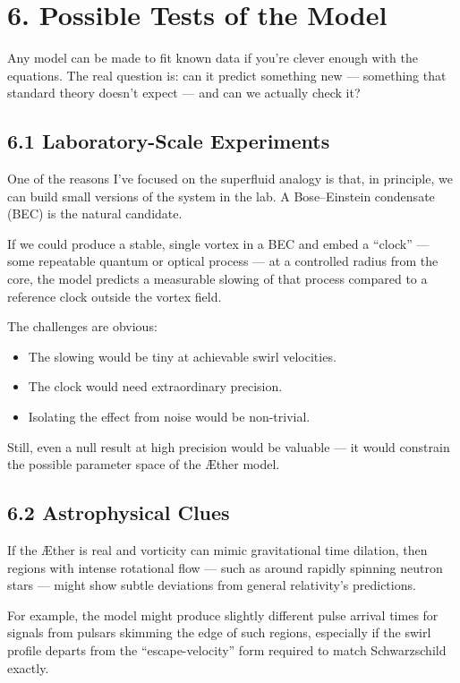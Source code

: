 \documentclass[11pt]{article}
\begin{document}
\section*{6. Possible Tests of the Model}

Any model can be made to fit known data if you’re clever enough with the equations. The real question is: can it predict something new — something that standard theory doesn’t expect — and can we actually check it?

\subsection*{6.1 Laboratory-Scale Experiments}

One of the reasons I’ve focused on the superfluid analogy is that, in principle, we can build small versions of the system in the lab. A Bose–Einstein condensate (BEC) is the natural candidate.

If we could produce a stable, single vortex in a BEC and embed a “clock” — some repeatable quantum or optical process — at a controlled radius from the core, the model predicts a measurable slowing of that process compared to a reference clock outside the vortex field.

The challenges are obvious:
\begin{itemize}
    \item The slowing would be tiny at achievable swirl velocities.
    \item The clock would need extraordinary precision.
    \item Isolating the effect from noise would be non-trivial.
\end{itemize}

Still, even a null result at high precision would be valuable — it would constrain the possible parameter space of the Æther model.

\subsection*{6.2 Astrophysical Clues}

If the Æther is real and vorticity can mimic gravitational time dilation, then regions with intense rotational flow — such as around rapidly spinning neutron stars — might show subtle deviations from general relativity’s predictions.

For example, the model might produce slightly different pulse arrival times for signals from pulsars skimming the edge of such regions, especially if the swirl profile departs from the “escape-velocity” form required to match Schwarzschild exactly.
\end{document}
